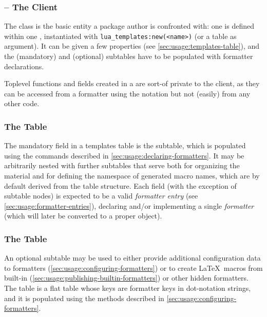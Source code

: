 \documentclass[12pt]{scrartcl}
\begin{document}
\subsubsection{ -- The Client}
\label{sec:advanced:templates-table}

The  class is the basic entity a package author is
confronted with: one  is defined within one ,
instantiated with \texttt{lua_templates:new(<name>)} (or a table as
argument).  It can be given a few properties (see
\vref{sec:usage:templates-table}), and the  (mandatory) and
 (optional) subtables have to be populated with formatter
declarations.

Toplevel functions and fields created in a  are sort-of
private to the client, as they can be accessed from a formatter using the
 notation but not (easily) from any other code.

\subsubsection{The  Table}
\label{sec:advanced:the-formatter-table}

The mandatory field in a templates table is the  subtable,
which is populated using the commands described in
\vref{sec:usage:declaring-formatters}. It may be arbitrarily nested with further
subtables that serve both for organizing the material and for defining the
namespace of generated macro names, which are by default derived from the table
structure.  Each field (with the exception of subtable nodes) is expected to be
a valid \emph{formatter entry} (see \vref{sec:usage:formatter-entries}),
declaring and/or implementing a single \emph{formatter} (which will later be
converted to a proper  object).


\subsubsection{The  Table}
\label{sec:advanced:the-configuration-table}

An optional subtable  may be used to either provide
additional configuration data to formatters
(\vref{sec:usage:configuring-formatters}) or to create \LaTeX\ macros from
built-in (\vref{sec:usage:publishing-builtin-formatters}) or other hidden
formatters.  The table is a flat table whose keys are formatter keys in
dot-notation strings, and it is populated using the methods described in
\vref{sec:usage:configuring-formatters}.
\end{document}

